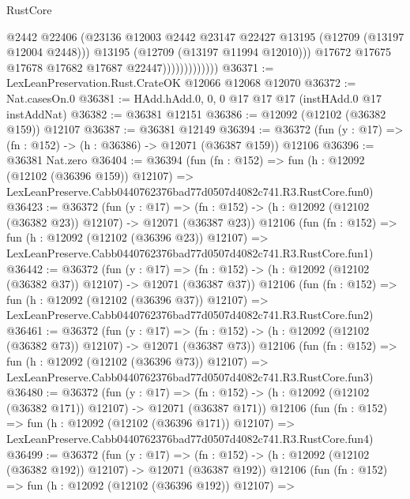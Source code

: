 \begin{lexlean}{RustCore}
\begin{coremodule}
                                @2442
                                @22406
                                (@23136
                                  @12003
                                  @2442
                                  @23147
                                  @22427
                                  @13195
                                  (@12709 (@13197 @12004 @2448)))
                                @13195
                                (@12709 (@13197 @11994 @12010)))
                              @17672
                              @17675
                              @17678
                              @17682
                              @17687
                              @22447)))))))))))))
@36371 := LexLeanPreservation.Rust.CrateOK @12066 @12068 @12070
@36372 := Nat.casesOn.{0}
@36381 := HAdd.hAdd.{0, 0, 0} @17 @17 @17 (instHAdd.{0} @17 instAddNat)
@36382 := @36381 @12151
@36386 := @12092 (@12102 (@36382 @159)) @12107
@36387 := @36381 @12149
@36394 := @36372 (fun (y : @17) => (fn : @152) -> (h : @36386) -> @12071 (@36387 @159)) @12106
@36396 := @36381 Nat.zero
@36404 := @36394
    (fun (fn : @152) =>
    fun (h : @12092 (@12102 (@36396 @159)) @12107) =>
    LexLeanPreserve.Cabb0440762376bad77d0507d4082c741.R3.RustCore.fun0)
@36423 := @36372
    (fun (y : @17) =>
    (fn : @152) -> (h : @12092 (@12102 (@36382 @23)) @12107) -> @12071 (@36387 @23))
    @12106
    (fun (fn : @152) =>
    fun (h : @12092 (@12102 (@36396 @23)) @12107) =>
    LexLeanPreserve.Cabb0440762376bad77d0507d4082c741.R3.RustCore.fun1)
@36442 := @36372
    (fun (y : @17) =>
    (fn : @152) -> (h : @12092 (@12102 (@36382 @37)) @12107) -> @12071 (@36387 @37))
    @12106
    (fun (fn : @152) =>
    fun (h : @12092 (@12102 (@36396 @37)) @12107) =>
    LexLeanPreserve.Cabb0440762376bad77d0507d4082c741.R3.RustCore.fun2)
@36461 := @36372
    (fun (y : @17) =>
    (fn : @152) -> (h : @12092 (@12102 (@36382 @73)) @12107) -> @12071 (@36387 @73))
    @12106
    (fun (fn : @152) =>
    fun (h : @12092 (@12102 (@36396 @73)) @12107) =>
    LexLeanPreserve.Cabb0440762376bad77d0507d4082c741.R3.RustCore.fun3)
@36480 := @36372
    (fun (y : @17) =>
    (fn : @152) -> (h : @12092 (@12102 (@36382 @171)) @12107) -> @12071 (@36387 @171))
    @12106
    (fun (fn : @152) =>
    fun (h : @12092 (@12102 (@36396 @171)) @12107) =>
    LexLeanPreserve.Cabb0440762376bad77d0507d4082c741.R3.RustCore.fun4)
@36499 := @36372
    (fun (y : @17) =>
    (fn : @152) -> (h : @12092 (@12102 (@36382 @192)) @12107) -> @12071 (@36387 @192))
    @12106
    (fun (fn : @152) =>
    fun (h : @12092 (@12102 (@36396 @192)) @12107) =>

\end{coremodule}
\end{lexlean}
